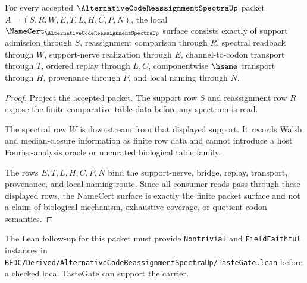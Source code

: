 \begin{theorem}
\label{thm:alternative-code-reassignment-spectra-namecert-obligations}
For every accepted $\AlternativeCodeReassignmentSpectraUp$ packet $A=(S,R,W,E,T,L,H,C,P,N)$, the local $\NameCert_{\AlternativeCodeReassignmentSpectraUp}$ surface consists exactly of support admission through $S$, reassignment comparison through $R$, spectral readback through $W$, support-nerve realization through $E$, channel-to-codon transport through $T$, ordered replay through $L,C$, componentwise $\hsame$ transport through $H$, provenance through $P$, and local naming through $N$.
\end{theorem}
\begin{proof}
Project the accepted packet. The support row $S$ and reassignment row $R$ expose the finite comparative table data before any spectrum is read.

The spectral row $W$ is downstream from that displayed support. It records Walsh and median-closure information as finite row data and cannot introduce a host Fourier-analysis oracle or uncurated biological table family.

The rows $E,T,L,H,C,P,N$ bind the support-nerve, bridge, replay, transport, provenance, and local naming route. Since all consumer reads pass through these displayed rows, the NameCert surface is exactly the finite packet surface and not a claim of biological mechanism, exhaustive coverage, or quotient codon semantics.
\end{proof}

The Lean follow-up for this packet must provide \texttt{Nontrivial} and \texttt{FieldFaithful} instances in \texttt{BEDC/Derived/AlternativeCodeReassignmentSpectraUp/TasteGate.lean} before a checked local TasteGate can support the carrier.



